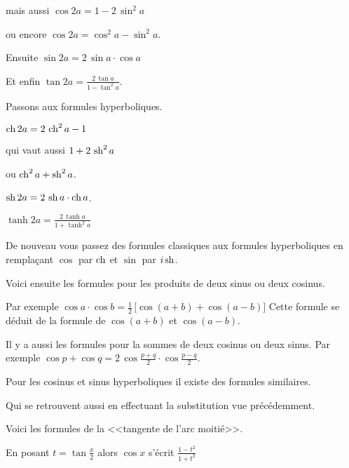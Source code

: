 \change

mais aussi $\cos 2a =1-2\,\sin^2a$

\change

ou encore $\cos 2a =\cos^2a-\sin^2a$.

\change

Ensuite $\sin 2a = 2\,\sin a\cdot\cos a$

\change

Et enfin
$\tan 2a = \displaystyle\frac{2\,\tan a}{1-\tan^2 a}$.

\change

Passons aux formules hyperboliques.

$\mathop{\mathrm{ch}}\nolimits 2a = 2\,\mathop{\mathrm{ch}}\nolimits^2a-1$

qui vaut aussi 
$1+2\,\mathop{\mathrm{sh}}\nolimits^2a$

ou $\mathop{\mathrm{ch}}\nolimits^2a+\mathop{\mathrm{sh}}\nolimits^2a$.


\change

$\mathop{\mathrm{sh}}\nolimits 2a = 2\,\mathop{\mathrm{sh}}\nolimits a\cdot\mathop{\mathrm{ch}}\nolimits a$.

\change

$\tanh 2a = \displaystyle\frac{2\,\tanh a}{1+\tanh^2 a}$


De nouveau vous passez des formules classiques aux formules hyperboliques
en remplaçant $\cos$ par $\mathop{\mathrm{ch}}\nolimits$ et $\sin$ par $i\mathop{\mathrm{sh}}\nolimits$.


\diapo

Voici ensuite les formules pour les produits de deux sinus ou deux cosinus.

Par exemple 
$\cos a\cdot\cos b = \frac{1}{2}\,\big[ \cos(a+b)+\cos(a-b)\big]$
Cette formule se déduit de la formule
de $\cos(a+b)$ et $\cos(a-b)$.

\change

Il y a aussi les formules pour la sommes de deux cosinus ou deux sinus.
Par exemple 
$\cos p+\cos q = 2\,\cos \frac{p+q}{2}\cdot\cos\frac{p-q}{2}$.


\change

Pour les cosinus et sinus hyperboliques il existe des formules similaires.

\change

Qui se retrouvent aussi en effectuant la substitution vue précédemment.


\diapo

Voici les formules de la <<tangente de l'arc moitié>>.

En posant $t=\tan \frac{x}{2}$ alors 
$\cos x$ s'écrit $\frac {1-t^2}{1+t^2}$

